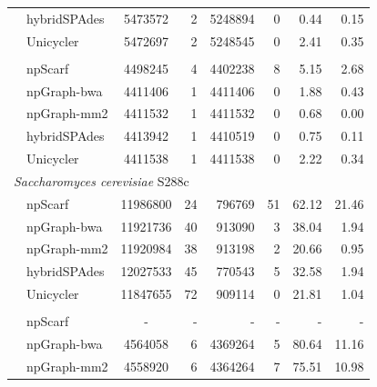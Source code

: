 \documentclass[10pt,twocolumn,twoside]{genpaper}
\begin{document}
\begin{longtable}[!hpt]{llcrrrrr}
& hybridSPAdes & 5473572  &  2  &  5248894  &  0  &  0.44 & 0.15\\*
& Unicycler & 5472697  & 2  & 5248545  &  0 & 2.41  &  0.35\\
\hline
\rowcolor{Gray}
\multicolumn{8}{l}{\emph{Mycobacterium tuberculosis} H37Rv} \\* %
\nobreakmidrule
\rowcolor{Gray}
& npScarf &  4498245 &  4  & 4402238   &  8  & 5.15  & 2.68\\*
\rowcolor{Gray}
& npGraph-bwa & 4411406  &  1  &  4411406  &  0  & 1.88  & 0.43\\*
\rowcolor{Gray}
& npGraph-mm2 & 4411532  & 1   &  4411532  &  0  & 0.68  & 0.00\\*
\rowcolor{Gray}
& hybridSPAdes & 4413942  &  1  &  4410519  &  0  &  0.75 &  0.11\\*
\rowcolor{Gray}
& Unicycler & 4411538  &  1  &  4411538  &  0  &  2.22 &  0.34\\
\hline
\multicolumn{8}{l}{\emph{Saccharomyces cerevisiae} S288c} \\* %
\nobreakmidrule
& npScarf &  11986800 &  24  &  796769  &  51  &  62.12 & 21.46 \\*
& npGraph-bwa & 11921736  &  40  &  913090  &  3 &  38.04 &  1.94\\*
& npGraph-mm2 & 11920984  &  38  &  913198  &  2 &  20.66 &  0.95\\*
& hybridSPAdes &  12027533 &  45  &  770543  &  5  & 32.58  & 1.94\\*
& Unicycler &  11847655 & 72  & 909114  &  0 & 21.81  &  1.04\\
\hline
\rowcolor{Gray}
\multicolumn{8}{l}{\emph{Shigella dysenteriae}  Sd197} \\* %
\nobreakmidrule
\rowcolor{Gray}
& npScarf &  - &  -  & -   &  -  & -  & -\\*
\rowcolor{Gray}
& npGraph-bwa & 4564058  &  6  &  4369264  &  5  & 80.64  & 11.16\\*
\rowcolor{Gray}
& npGraph-mm2 & 4558920  &  6  &  4364264  &  7  & 75.51  & 10.98\\*

\end{longtable}
\end{document}
